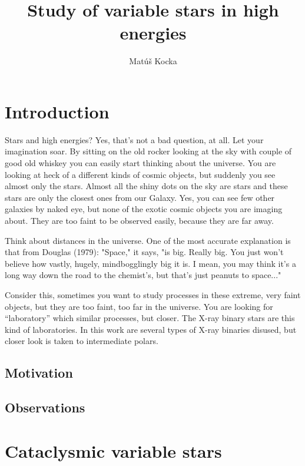 \documentclass[oneside,a4paper,11pt]{report}
\title{Study of variable stars in high energies }
\author{Matúš Kocka}
\begin{document}




\pagebreak
\tableofcontents

\chapter{Introduction}

Stars and high energies? Yes, that's not a bad question, at all. Let your imagination soar. 
By sitting on the old rocker looking at the sky with couple of good old whiskey you can easily 
start thinking about the universe. You are looking at heck of a different kinds of cosmic 
objects, but suddenly you see almost only the stars. Almost all the shiny dots on the sky are 
stars and these stars are only the closest ones from our Galaxy. Yes, you can see few other 
galaxies by naked eye, but none of the exotic cosmic objects you are imaging about. 
They are too faint to be observed easily, because they are far away. 

Think about distances in the universe. One of the most accurate explanation is that from 
Douglas (1979):  "Space," it says, "is big. Really big. You just won't believe how vastly, 
hugely, mindbogglingly big it is. I mean, you may think it's a long way down the road to the 
chemist's, but that's just peanuts to space..."

Consider this, sometimes you want to study processes in these extreme, very faint objects, 
but they are too faint, too far in the universe. You are looking for “laboratory” which similar
 processes, but closer. The X-ray binary stars are this kind of laboratories. In this work are
 several types of X-ray binaries disused, but closer look is taken to intermediate polars. 
\section{Motivation}
\section{Observations}


\chapter{Cataclysmic variable stars}
\end{document}
